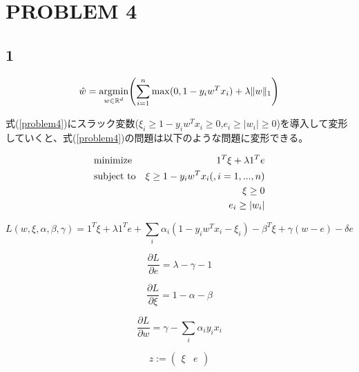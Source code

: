 \documentclass[a4j,11pt]{jarticle}
\newcommand{\argmin}{\mathop{\rm argmin}\limits}
\begin{document}
\newpage
\section{PROBLEM 4}
\subsection*{1}
\begin{equation}
    \hat{w} = \argmin_{w\in \mathbb{R}^d} \Biggl(\sum_{i=1}^{n}\max(0,1-y_iw^Tx_i) + \lambda \|w\|_1 \Biggr) \label{problem4}
\end{equation}

式(\ref{problem4})にスラック変数($\xi_i \geq 1-y_iw^Tx_i \geq 0$,$e_i \geq |w_i| \geq 0$)を導入して変形していくと、式(\ref{problem4})の問題は以下のような問題に変形できる。

\begin{equation}
    \begin{aligned}
        & \text{minimize}
            &  1^T\xi + \lambda 1^Te\\
        &\text{subject to}
            & \xi \geq 1-y_iw^Tx_i \text(,i = 1,...,n)\\
            && \xi \geq 0\\
            && e_i \geq |w_i| 
    \end{aligned}
\end{equation}

\begin{equation*}
    L(w,\xi,\alpha,\beta,\gamma) = 1^T\xi + \lambda 1^Te + \sum_i \alpha_i(1-y_iw^Tx_i-\xi_i) - \beta^T\xi + \gamma(w-e) - \delta e
\end{equation*}

\begin{equation*}
    \frac{\partial L}{\partial e} = \lambda - \gamma - 1
\end{equation*}

\begin{equation*}
    \frac{\partial L}{\partial \xi} = 1-\alpha-\beta
\end{equation*}

\begin{equation*}
    \frac{\partial L}{\partial w} = \gamma - \sum_i \alpha_i y_i x_i
\end{equation*}

\begin{equation*}
    z :=
    \begin{pmatrix}
        \xi & e
    \end{pmatrix}
\end{equation*}
\end{document}
